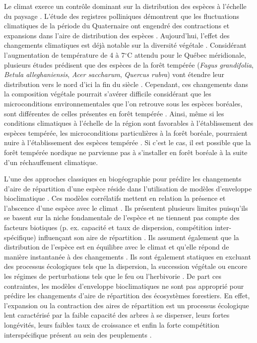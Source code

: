Le climat exerce un contrôle dominant sur la distribution des espèces à l'échelle du paysage
\citep{Pearson2003b}. L'étude des registres polliniques démontrent que les fluctuations climatiques
de la période du Quaternaire ont engendré des contractions et expansions dans l'aire de distribution
des espèces \citep{Davis2001}. Aujourd'hui, l'effet des changements climatiques est déjà notable sur
la diversité végétale \citep{Walther2002a,Parmesan2006}. Considérant l'augmentation de température
de 4 à 7$^\circ$C \citep[Scénario RCP 8.5]{Climatique2015} attendu pour le Québec méridionale,
plusieurs études prédisent que des espèces de la forêt tempérée (\textit{Fagus grandifolia},
\textit{Betula alleghaniensis}, \textit{Acer saccharum}, \textit{Quercus rubra}) vont étendre leur
distribution vers le nord d'ici la fin du siècle \citep{Iverson2002,Sciences2014}. Cependant, ces
changements dans la composition végétale pourrait s'avérer difficile considérant que les
microconditions environnementales que l’on retrouve sous les espèces boréales, sont différentes de
celles présentes en forêt tempérée \citep{Barras1998,Caspersen2005}. Ainsi, même si les conditions
climatiques à l'échelle de la région sont favorables à l'établissement des espèces tempérée, les
microconditions particulières à la forêt boréale, pourraient nuire à l'établissement des espèces
tempérée \citep{DeFrenne2013,Lafleur2010}. Si c’est le cas, il est possible que la forêt tempérée
nordique ne parvienne pas à s'installer en forêt boréale à la suite d’un réchauffement climatique.

L'une des approches classiques en biogéographie pour prédire les changements d'aire de répartition
d'une espèce réside dans l'utilisation de modèles d'enveloppe bioclimatique \citep{Pearson2003b}.
Ces modèles corrélatifs mettent en relation la présence et l'abscence d'une espèce avec le climat
\citep{Guisan2005a}. Ils présentent plusieurs limites puisqu'ils se basent sur la niche fondamentale
de l'espèce et ne tiennent pas compte des facteurs biotiques (p. ex. capacité et taux de dispersion,
compétition inter-spécifique) influençant son aire de répartition \citep{Guisan2005a,Pearson2003b}.
Ils assument également que la distribution de l'espèce est en équilibre avec le climat et qu'elle
répond de manière instantanée à des changements \citep{Austin2002}. Ils sont également statiques en
excluant des processus écologiques tels que la dispersion, la succession végétale ou encore les
régimes de perturbations tels que le feu ou l'herbivorie \citep{Austin2002,Guisan2005a}.  De part
ces contraintes, les modèles d'enveloppe bioclimatiques ne sont pas approprié pour prédire les
changements d'aire de répartition des écosystèmes forestiers. En effet, l'expansion ou la
contraction des aires de répartition est un processus écologique lent caractérisé par la faible
capacité des arbres à se disperser, leurs fortes longévités, leurs faibles taux de croissance et
enfin la forte compétition interspécifique présent au sein des peuplements
\citep{Renwick2014,Vanderwel2014}.

